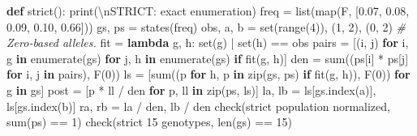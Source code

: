\documentclass[
]{article}
\newenvironment{Shaded}{}{}
\newcommand{\BuiltInTok}[1]{\textcolor[rgb]{0.00,0.50,0.00}{#1}}
\newcommand{\CharTok}[1]{\textcolor[rgb]{0.25,0.44,0.63}{#1}}
\newcommand{\CommentTok}[1]{\textcolor[rgb]{0.38,0.63,0.69}{\textit{#1}}}
\newcommand{\ControlFlowTok}[1]{\textcolor[rgb]{0.00,0.44,0.13}{\textbf{#1}}}
\newcommand{\DecValTok}[1]{\textcolor[rgb]{0.25,0.63,0.44}{#1}}
\newcommand{\KeywordTok}[1]{\textcolor[rgb]{0.00,0.44,0.13}{\textbf{#1}}}
\newcommand{\NormalTok}[1]{#1}
\newcommand{\OperatorTok}[1]{\textcolor[rgb]{0.40,0.40,0.40}{#1}}
\newcommand{\StringTok}[1]{\textcolor[rgb]{0.25,0.44,0.63}{#1}}
\begin{document}
\begin{Shaded}
\begin{Highlighting}[]
\KeywordTok{def}\NormalTok{ strict():}
    \BuiltInTok{print}\NormalTok{(}\StringTok{\textquotesingle{}}\CharTok{\textbackslash{}n}\StringTok{STRICT: exact enumeration\textquotesingle{}}\NormalTok{)}
\NormalTok{    freq }\OperatorTok{=} \BuiltInTok{list}\NormalTok{(}\BuiltInTok{map}\NormalTok{(F, [}\StringTok{\textquotesingle{}0.07\textquotesingle{}}\NormalTok{, }\StringTok{\textquotesingle{}0.08\textquotesingle{}}\NormalTok{, }\StringTok{\textquotesingle{}0.09\textquotesingle{}}\NormalTok{, }\StringTok{\textquotesingle{}0.10\textquotesingle{}}\NormalTok{, }\StringTok{\textquotesingle{}0.66\textquotesingle{}}\NormalTok{]))}
\NormalTok{    gs, ps }\OperatorTok{=}\NormalTok{ states(freq)}
\NormalTok{    obs, a, b }\OperatorTok{=} \BuiltInTok{set}\NormalTok{(}\BuiltInTok{range}\NormalTok{(}\DecValTok{4}\NormalTok{)), (}\DecValTok{1}\NormalTok{, }\DecValTok{2}\NormalTok{), (}\DecValTok{0}\NormalTok{, }\DecValTok{2}\NormalTok{)  }\CommentTok{\# Zero{-}based alleles.}
\NormalTok{    fit }\OperatorTok{=} \KeywordTok{lambda}\NormalTok{ g, h: }\BuiltInTok{set}\NormalTok{(g) }\OperatorTok{|} \BuiltInTok{set}\NormalTok{(h) }\OperatorTok{==}\NormalTok{ obs}
\NormalTok{    pairs }\OperatorTok{=}\NormalTok{ [(i, j) }\ControlFlowTok{for}\NormalTok{ i, g }\KeywordTok{in} \BuiltInTok{enumerate}\NormalTok{(gs)}
             \ControlFlowTok{for}\NormalTok{ j, h }\KeywordTok{in} \BuiltInTok{enumerate}\NormalTok{(gs) }\ControlFlowTok{if}\NormalTok{ fit(g, h)]}
\NormalTok{    den }\OperatorTok{=} \BuiltInTok{sum}\NormalTok{((ps[i] }\OperatorTok{*}\NormalTok{ ps[j] }\ControlFlowTok{for}\NormalTok{ i, j }\KeywordTok{in}\NormalTok{ pairs), F(}\DecValTok{0}\NormalTok{))}
\NormalTok{    ls }\OperatorTok{=}\NormalTok{ [}\BuiltInTok{sum}\NormalTok{((p }\ControlFlowTok{for}\NormalTok{ h, p }\KeywordTok{in} \BuiltInTok{zip}\NormalTok{(gs, ps) }\ControlFlowTok{if}\NormalTok{ fit(g, h)), F(}\DecValTok{0}\NormalTok{))}
          \ControlFlowTok{for}\NormalTok{ g }\KeywordTok{in}\NormalTok{ gs]}
\NormalTok{    post }\OperatorTok{=}\NormalTok{ [p }\OperatorTok{*}\NormalTok{ ll }\OperatorTok{/}\NormalTok{ den }\ControlFlowTok{for}\NormalTok{ p, ll }\KeywordTok{in} \BuiltInTok{zip}\NormalTok{(ps, ls)]}
\NormalTok{    la, lb }\OperatorTok{=}\NormalTok{ ls[gs.index(a)], ls[gs.index(b)]}
\NormalTok{    ra, rb }\OperatorTok{=}\NormalTok{ la }\OperatorTok{/}\NormalTok{ den, lb }\OperatorTok{/}\NormalTok{ den}
\NormalTok{    check(}\StringTok{\textquotesingle{}strict population normalized\textquotesingle{}}\NormalTok{, }\BuiltInTok{sum}\NormalTok{(ps) }\OperatorTok{==} \DecValTok{1}\NormalTok{)}
\NormalTok{    check(}\StringTok{\textquotesingle{}strict 15 genotypes\textquotesingle{}}\NormalTok{, }\BuiltInTok{len}\NormalTok{(gs) }\OperatorTok{==} \DecValTok{15}\NormalTok{)}

\end{Highlighting}
\end{Shaded}
\end{document}
